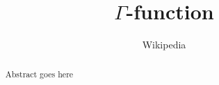 \documentclass[twocolumn,a4paper]{article}
\begin{document}
\title{$\Gamma$-function}
\author{Wikipedia}
\maketitle
\begin{abstract}
Abstract goes here
\end{abstract}
\end{document}
